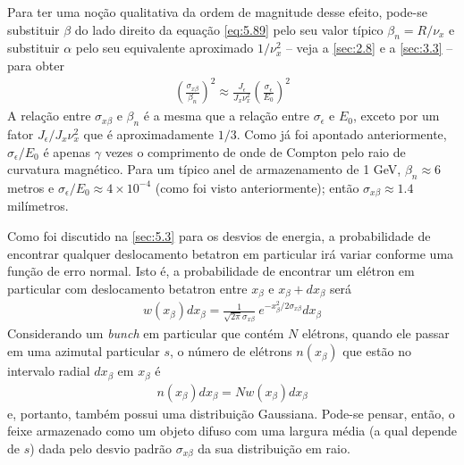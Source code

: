 Para ter uma noção qualitativa da ordem de magnitude desse efeito, pode-se substituir $\beta$ do lado direito da equação \eqref{eq:5.89} pelo seu valor típico $\beta_n = R/\nu_x$ e substituir $\alpha$ pelo seu equivalente aproximado $1/\nu_x^2$ -- veja a \autoref{sec:2.8} e a \autoref{sec:3.3} -- para obter
\begin{align}
	\left(\frac{\sigma_{x\beta}}{\beta_n}\right)^2 \approx \frac{J_\epsilon}{J_x \nu_x^2}\left(\frac{\sigma_\epsilon}{E_0}\right)^2
\end{align}
A relação entre $\sigma_{x\beta}$ e $\beta_n$ é a mesma que a relação entre $\sigma_\epsilon$ e $E_0$, exceto por um fator $J_\epsilon/J_x \nu_x^2$ que é aproximadamente $1/3$. Como já foi apontado anteriormente, $\sigma_\epsilon/E_0$ é apenas $\gamma$ vezes o comprimento de onde de Compton pelo raio de curvatura magnético. Para um típico anel de armazenamento de 1 GeV, $\beta_n \approx 6$ metros e $\sigma_\epsilon/E_0 \approx 4 \times 10^{-4}$ (como foi visto anteriormente); então $\sigma_{x\beta} \approx 1.4$ milímetros. 

Como foi discutido na \autoref{sec:5.3} para os desvios de energia, a probabilidade de encontrar qualquer deslocamento betatron em particular irá variar conforme uma função de erro normal. Isto é, a probabilidade de encontrar um elétron em particular com deslocamento betatron entre $x_\beta$ e $x_\beta + dx_\beta$ será
\begin{align}
	w(x_\beta)dx_\beta = \frac{1}{\sqrt{2\pi} \sigma_{x\beta}}\ e^{-x_\beta^2/2\sigma_{x\beta}}dx_\beta
\end{align}
Considerando um \textit{bunch} em particular que contém $N$ elétrons, quando ele passar em uma azimutal particular $s$, o número de elétrons $n(x_\beta)$ que estão no intervalo radial $dx_\beta$ em $x_\beta$ é
\begin{align}
	n(x_\beta)dx_\beta = Nw(x_\beta)dx_\beta
\end{align}
e, portanto, também possui uma distribuição Gaussiana. Pode-se pensar, então, o feixe armazenado como um objeto difuso com uma largura média (a qual depende de $s$) dada pelo desvio padrão $\sigma_{x\beta}$ da sua distribuição em raio.

